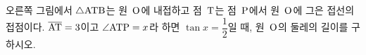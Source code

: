 \noindent\begin{minipage}[t]{0.58\linewidth}\vspace{0pt}\raggedright 오른쪽 그림에서 $\triangle\mathrm{ATB}$는 원~$\mathrm{O}$에 내접하고 점~$\mathrm{T}$는 점~$\mathrm{P}$에서 원~$\mathrm{O}$에 그은 접선의 접점이다. $\overline{\mathrm{AT}}=3$이고 $\angle\mathrm{ATP}=x$라 하면 $\tan x=\dfrac{1}{2}$일 때, 원~$\mathrm{O}$의 둘레의 길이를 구하시오. \end{minipage}\hfill\begin{minipage}[t]{0.4\linewidth}\vspace{0pt}\centering \resizebox{\ifdim\width>\linewidth\linewidth\else\width\fi}{!}{}\end{minipage}\par
